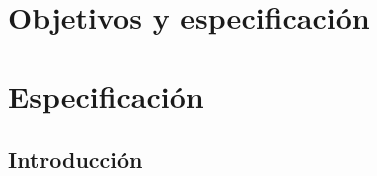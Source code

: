 %
%
%
%
%
%
%
%
%
%

\chapter{Objetivos y especificaci\'on}
\label{cap3}
\label{cap:objetivos}

\begin{FraseCelebre}
\begin{Frase}
\end{Frase}
\begin{Fuente}
\end{Fuente}
\end{FraseCelebre}


\chapter{Especificaci\'on}
\label{cap3}
\label{cap:especificacion}

\section{Introducci\'on}
\label{cap3:sec:intro}

